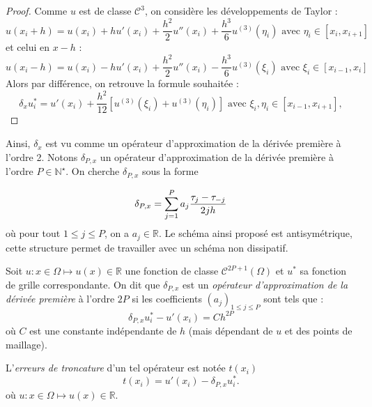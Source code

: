 \begin{proof}
Comme $u$ est de classe $\mathcal{C}^3$, on considère les développements de Taylor :
\begin{equation}
u(x_i+h) = u(x_i) + h u'(x_i) + \dfrac{h^2}{2} u''(x_i) + \dfrac{h^3}{6} u^{(3)} (\eta_i) \text{ avec } \eta_i \in [x_i, x_{i+1}]
\end{equation}
et celui en $x-h$ :
\begin{equation}
u(x_i-h) = u(x_i) - h u'(x_i) + \dfrac{h^2}{2} u''(x_i) - \dfrac{h^3}{6}u^{(3)}(\xi_i) \text{ avec } \xi_i \in [x_{i-1}, x_{i}]
\end{equation}
Alors par différence, on retrouve la formule souhaitée : 
\begin{equation}
\delta_x u^*_i = u'(x_i) + \dfrac{h^2}{12} \left[ u^{(3)}(\xi_i) + u^{(3)}(\eta_i) \right]  \text{ avec } \xi_i, \eta_i \in [x_{i-1}, x_{i+1}],
\end{equation}
\end{proof}

Ainsi, $\delta_x$ est vu comme un opérateur d'approximation de la dérivée première à l'ordre 2.
Notons $\delta_{P,x}$ un opérateur d'approximation de la dérivée première à l'ordre $P \in \mathbb{N}^{\star}$. On cherche $\delta_{P,x}$ sous la forme

\begin{equation}
\delta_{P,x} = \displaystyle\sum\limits_{j=1}^P a_j \dfrac{\tau_j - \tau_{-j}}{2 j h}
\label{eq:explicite_dx}
\end{equation}
où  pour tout $1 \leq j \leq P$, on a $a_j \in \mathbb{R}$. Le schéma ainsi proposé est antisymétrique, cette structure permet de travailler avec un schéma non dissipatif. 

\begin{definition}
Soit $u :  x \in \Omega \mapsto u(x) \in \mathbb{R}$ une fonction de classe $\mathcal{C}^{2P+1} ( \Omega )$ et $u^*$ sa fonction de grille correspondante. On dit que $\delta_{P,x}$ est un \textit{opérateur d'approximation de la dérivée première} à l'ordre $2P$ si les coefficients $(a_j)_{1 \leq j \leq P}$ sont tels que :
\begin{equation}
\delta_{P,x} u^*_i - u'(x_i) = C h^{2P}
\label{eq:consistance_delta_x_order_2P}
\end{equation}
où $C$ est une constante indépendante de $h$ (mais dépendant de $u$ et des points de maillage). 
\end{definition}

L'\textit{erreurs de troncature} d'un tel opérateur est notée $t(x_i)$ 
\begin{equation}
t(x_i) = u'(x_i) - \delta_{P,x} u^*_i.
\end{equation}
où $u : x \in \Omega \mapsto u(x) \in \mathbb{R}$.

